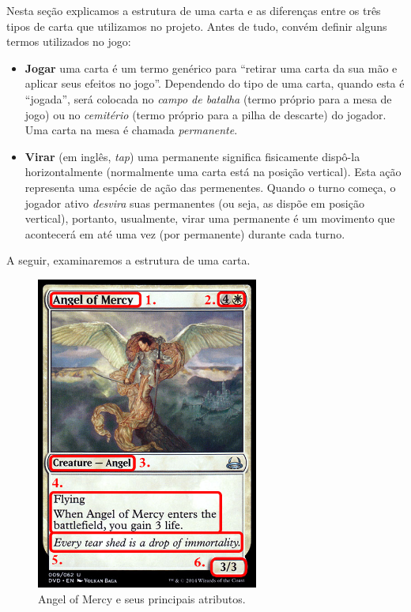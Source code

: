 Nesta seção explicamos a estrutura de uma carta e as diferenças entre os três tipos de carta que utilizamos no projeto. Antes de tudo, convém definir alguns termos utilizados no jogo:

\begin{itemize}
  \item \textbf{Jogar} uma carta é um termo genérico para ``retirar uma carta da sua mão e aplicar seus efeitos no jogo''. Dependendo do tipo de uma carta, quando esta é ``jogada'', será colocada no \textit{campo de batalha} (termo próprio para a mesa de jogo) ou no \textit{cemitério} (termo próprio para a pilha de descarte) do jogador. Uma carta na mesa é chamada \textit{permanente}.
  \item \textbf{Virar} (em inglês, \textit{tap}) uma permanente significa fisicamente dispô-la horizontalmente (normalmente uma carta está na posição vertical). Esta ação representa uma espécie de ação das permenentes. Quando o turno começa, o jogador ativo \textit{desvira} suas permanentes (ou seja, as dispõe em posição vertical), portanto, usualmente, virar uma permanente é um movimento que acontecerá em até uma vez (por permanente) durante cada turno.
\end{itemize}

A seguir, examinaremos a estrutura de uma carta.

\begin{figure}[!ht]
    \centering
    \includegraphics[width=0.65\textwidth]{picstcc/angelnumbers.png}
    \caption{Angel of Mercy e seus principais atributos.}
    \label{cardinfo}
\end{figure}


